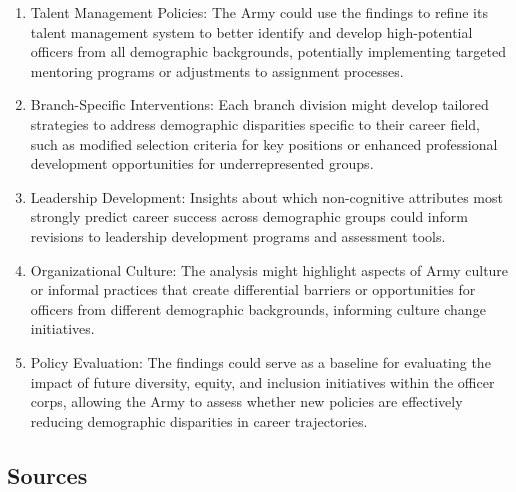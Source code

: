 \documentclass[
  letterpaper,
  DIV=11,
  numbers=noendperiod]{scrartcl}
\begin{document}
\begin{enumerate}
\def\labelenumi{\arabic{enumi}.}
\item
  Talent Management Policies: The Army could use the findings to refine
  its talent management system to better identify and develop
  high-potential officers from all demographic backgrounds, potentially
  implementing targeted mentoring programs or adjustments to assignment
  processes.
\item
  Branch-Specific Interventions: Each branch division might develop
  tailored strategies to address demographic disparities specific to
  their career field, such as modified selection criteria for key
  positions or enhanced professional development opportunities for
  underrepresented groups.
\item
  Leadership Development: Insights about which non-cognitive attributes
  most strongly predict career success across demographic groups could
  inform revisions to leadership development programs and assessment
  tools.
\item
  Organizational Culture: The analysis might highlight aspects of Army
  culture or informal practices that create differential barriers or
  opportunities for officers from different demographic backgrounds,
  informing culture change initiatives.
\item
  Policy Evaluation: The findings could serve as a baseline for
  evaluating the impact of future diversity, equity, and inclusion
  initiatives within the officer corps, allowing the Army to assess
  whether new policies are effectively reducing demographic disparities
  in career trajectories.
\end{enumerate}

\subsection{Sources}\label{sources}
\end{document}
